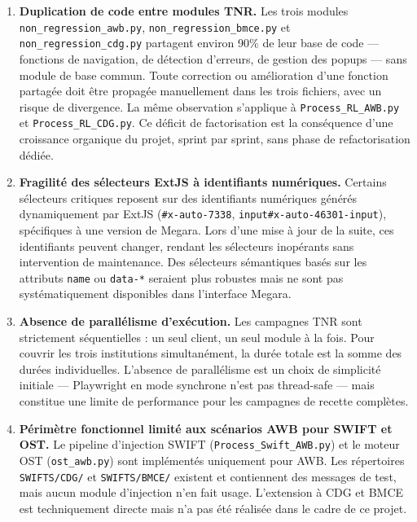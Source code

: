 \documentclass[12pt, a4paper]{report}
\begin{document}
\begin{enumerate}[label=\textbf{L\arabic*.}, leftmargin=*, itemsep=4pt]

  \item \textbf{Duplication de code entre modules TNR.}
  Les trois modules \texttt{non\_regression\_awb.py}, \texttt{non\_regression\_bmce.py} et \texttt{non\_regression\_cdg.py} partagent environ 90\% de leur base de code — fonctions de navigation, de détection d'erreurs, de gestion des popups — sans module de base commun. Toute correction ou amélioration d'une fonction partagée doit être propagée manuellement dans les trois fichiers, avec un risque de divergence. La même observation s'applique à \texttt{Process\_RL\_AWB.py} et \texttt{Process\_RL\_CDG.py}. Ce déficit de factorisation est la conséquence d'une croissance organique du projet, sprint par sprint, sans phase de refactorisation dédiée.

  \item \textbf{Fragilité des sélecteurs ExtJS à identifiants numériques.}
  Certains sélecteurs critiques reposent sur des identifiants numériques générés dynamiquement par ExtJS (\texttt{\#x-auto-7338}, \texttt{input\#x-auto-46301-input}), spécifiques à une version de Megara. Lors d'une mise à jour de la suite, ces identifiants peuvent changer, rendant les sélecteurs inopérants sans intervention de maintenance. Des sélecteurs sémantiques basés sur les attributs \texttt{name} ou \texttt{data-*} seraient plus robustes mais ne sont pas systématiquement disponibles dans l'interface Megara.

  \item \textbf{Absence de parallélisme d'exécution.}
  Les campagnes TNR sont strictement séquentielles : un seul client, un seul module à la fois. Pour couvrir les trois institutions simultanément, la durée totale est la somme des durées individuelles. L'absence de parallélisme est un choix de simplicité initiale — Playwright en mode synchrone n'est pas thread-safe — mais constitue une limite de performance pour les campagnes de recette complètes.

  \item \textbf{Périmètre fonctionnel limité aux scénarios AWB pour SWIFT et OST.}
  Le pipeline d'injection SWIFT (\texttt{Process\_Swift\_AWB.py}) et le moteur OST (\texttt{ost\_awb.py}) sont implémentés uniquement pour AWB. Les répertoires \texttt{SWIFTS/CDG/} et \texttt{SWIFTS/BMCE/} existent et contiennent des messages de test, mais aucun module d'injection n'en fait usage. L'extension à CDG et BMCE est techniquement directe mais n'a pas été réalisée dans le cadre de ce projet.


\end{enumerate}
\end{document}
